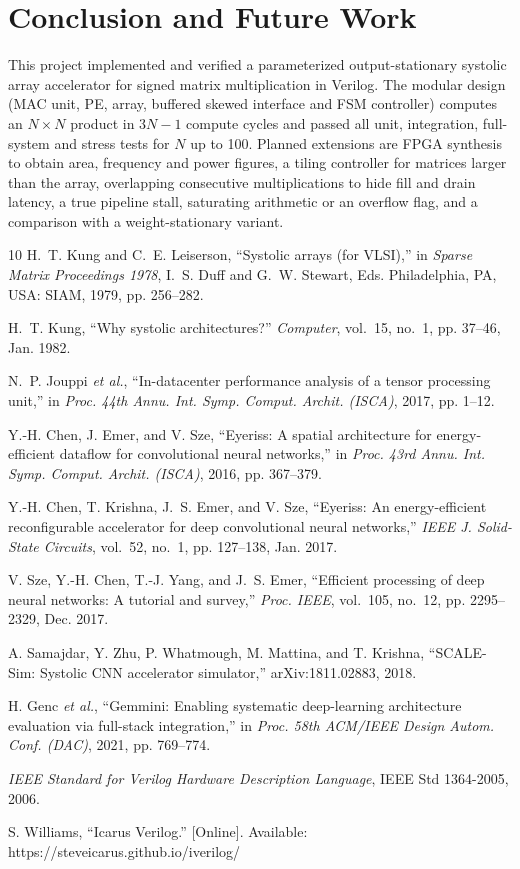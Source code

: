 \documentclass[conference]{IEEEtran}
\begin{document}
\section{Conclusion and Future Work}
This project implemented and verified a parameterized output-stationary systolic array
accelerator for signed matrix multiplication in Verilog. The modular design (MAC unit, PE,
array, buffered skewed interface and FSM controller) computes an $N\times N$ product in
$3N-1$ compute cycles and passed all unit, integration, full-system and stress tests for $N$
up to 100. Planned extensions are FPGA synthesis to obtain area, frequency and power figures,
a tiling controller for matrices larger than the array, overlapping consecutive
multiplications to hide fill and drain latency, a true pipeline stall, saturating arithmetic
or an overflow flag, and a comparison with a weight-stationary variant.

\begin{thebibliography}{10}
H.~T. Kung and C.~E. Leiserson, ``Systolic arrays (for VLSI),'' in \emph{Sparse Matrix
Proceedings 1978}, I.~S. Duff and G.~W. Stewart, Eds. Philadelphia, PA, USA: SIAM, 1979,
pp. 256--282.

H.~T. Kung, ``Why systolic architectures?'' \emph{Computer}, vol.~15, no.~1, pp. 37--46,
Jan. 1982.

N.~P. Jouppi \emph{et al.}, ``In-datacenter performance analysis of a tensor processing
unit,'' in \emph{Proc. 44th Annu. Int. Symp. Comput. Archit. (ISCA)}, 2017, pp. 1--12.

Y.-H. Chen, J. Emer, and V. Sze, ``Eyeriss: A spatial architecture for energy-efficient
dataflow for convolutional neural networks,'' in \emph{Proc. 43rd Annu. Int. Symp. Comput.
Archit. (ISCA)}, 2016, pp. 367--379.

Y.-H. Chen, T. Krishna, J.~S. Emer, and V. Sze, ``Eyeriss: An energy-efficient
reconfigurable accelerator for deep convolutional neural networks,'' \emph{IEEE J.
Solid-State Circuits}, vol.~52, no.~1, pp. 127--138, Jan. 2017.

V. Sze, Y.-H. Chen, T.-J. Yang, and J.~S. Emer, ``Efficient processing of deep neural
networks: A tutorial and survey,'' \emph{Proc. IEEE}, vol.~105, no.~12, pp. 2295--2329,
Dec. 2017.

A. Samajdar, Y. Zhu, P. Whatmough, M. Mattina, and T. Krishna, ``SCALE-Sim: Systolic CNN
accelerator simulator,'' arXiv:1811.02883, 2018.

H. Genc \emph{et al.}, ``Gemmini: Enabling systematic deep-learning architecture evaluation
via full-stack integration,'' in \emph{Proc. 58th ACM/IEEE Design Autom. Conf. (DAC)}, 2021,
pp. 769--774.

\emph{IEEE Standard for Verilog Hardware Description Language}, IEEE Std 1364-2005, 2006.

S. Williams, ``Icarus Verilog.'' [Online]. Available: https://steveicarus.github.io/iverilog/
\end{thebibliography}
\end{document}
